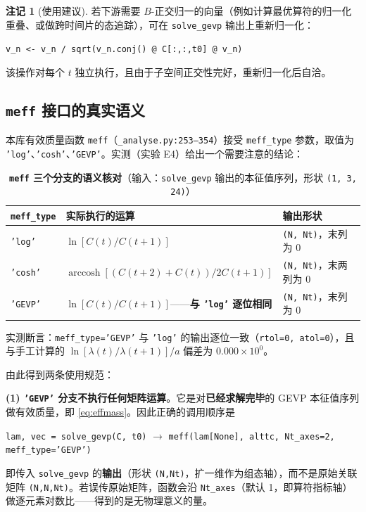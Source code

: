 \documentclass[12pt,a4paper]{ctexart}
\theoremstyle{definition}
\newtheorem{remark}{注记}[section]
\newcommand{\code}[1]{\texttt{#1}}
\begin{document}
\begin{remark}[使用建议]
若下游需要 $B$-正交归一的向量（例如计算最优算符的归一化重叠、或做跨时间片的态追踪），可在 \code{solve\_gevp} 输出上重新归一化：
\begin{center}
\code{v\_n <- v\_n / sqrt(v\_n.conj() @ C[:,:,t0] @ v\_n)}
\end{center}
该操作对每个 $t$ 独立执行，且由于子空间正交性完好，重新归一化后自洽。
\end{remark}

\subsection{\code{meff} 接口的真实语义}\label{subsec:meffsemantics}

本库有效质量函数 \code{meff}（\code{\_analyse.py:253--354}）接受 \code{meff\_type} 参数，取值为 \code{'log'}、\code{'cosh'}、\code{'GEVP'}。实测（实验 E4）给出一个需要注意的结论：

\begin{table}[htbp]
\centering
\caption{\textbf{\code{meff} 三个分支的语义核对}（输入：\code{solve\_gevp} 输出的本征值序列，形状 \code{(1, 3, 24)}）}
\label{tab:meff}
\begin{tabular}{lll}
\toprule
\code{meff\_type} & 实际执行的运算 & 输出形状 \\
\midrule
\code{'log'} & $\ln[C(t)/C(t+1)]$ & \code{(N, Nt)}，末列为 0 \\
\code{'cosh'} & $\operatorname{arccosh}[(C(t+2)+C(t))/2C(t+1)]$ & \code{(N, Nt)}，末两列为 0 \\
\code{'GEVP'} & $\ln[C(t)/C(t+1)]$——\textbf{与 \code{'log'} 逐位相同} & \code{(N, Nt)}，末列为 0 \\
\bottomrule
\end{tabular}
\end{table}

实测断言：\code{meff\_type='GEVP'} 与 \code{'log'} 的输出逐位一致（\code{rtol=0, atol=0}），且与手工计算的 $\ln[\lambda(t)/\lambda(t+1)]/a$ 偏差为 $0.000\times10^{0}$。

由此得到两条使用规范：

\textbf{(1) \code{'GEVP'} 分支不执行任何矩阵运算}。它是对\textbf{已经求解完毕}的 GEVP 本征值序列做有效质量，即 \eqref{eq:effmass}。因此正确的调用顺序是
\begin{center}
\code{lam, vec = solve\_gevp(C, t0)} $\to$ \code{meff(lam[None], alttc, Nt\_axes=2, meff\_type='GEVP')}
\end{center}
即传入 \code{solve\_gevp} 的\textbf{输出}（形状 \code{(N,Nt)}，扩一维作为组态轴），而不是原始关联矩阵 \code{(N,N,Nt)}。若误传原始矩阵，函数会沿 \code{Nt\_axes}（默认 1，即算符指标轴）做逐元素对数比——得到的是无物理意义的量。
\end{document}
